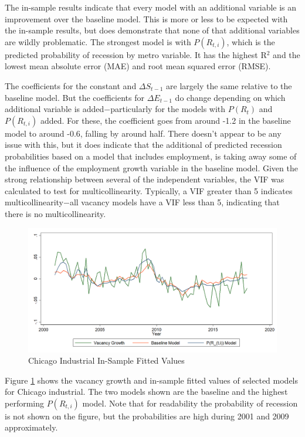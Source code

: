 \documentclass[10pt]{article}
\begin{document}
The in-sample results indicate that every model with an additional variable is an improvement over the baseline model.  This is more or less to be expected with the in-sample results, but does demonstrate that none of that additional variables are wildly problematic.  The strongest model is with $P(R_{t,i})$, which is the predicted probability of recession by metro variable.  It has the highest R$^2$ and the lowest mean absolute error (MAE) and root mean squared error (RMSE).

The coefficients for the constant and $\Delta S_{t-1}$ are largely the same relative to the baseline model.  But the coefficients for $\Delta E_{t-1}$ do change depending on which additional variable is added$-$particularly for the models with $P(R_t)$ and $P(R_{t,i})$ added.  For these, the coefficient goes from around -1.2 in the baseline model to around -0.6, falling by around half.  There doesn't appear to be any issue with this, but it does indicate that the additional of predicted recession probabilities based on a model that includes employment, is taking away some of the influence of the employment growth variable in the baseline model. Given the strong relationship between several of the independent variables, the VIF was calculated to test for multicollinearity.  Typically, a VIF greater than 5 indicates multicollinearity$-$all vacancy models have a VIF less than 5, indicating that there is no multicollinearity.

\begin{figure}[h]
\begin{center}
\caption{Chicago Industrial In-Sample Fitted Values} \label{fig:chic-in}
\includegraphics[scale=0.22]{chicind-insample-3.png}
\end{center}
\end{figure}

Figure \ref{fig:chic-in} shows the vacancy growth and in-sample fitted values of selected models for Chicago industrial.  The two models shown are the baseline and the highest performing $P(R_{t,i})$ model.  Note that for readability the probability of recession is not shown on the figure, but the probabilities are high during 2001 and 2009 approximately.  
\end{document}
